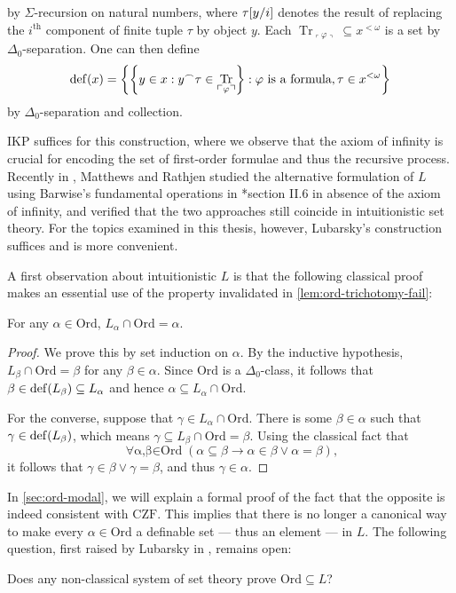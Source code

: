\documentclass[12pt,openany]{book}
\theoremstyle{plain}
\theoremstyle{definition}
\newcommand\god[1]{\left\ulcorner #1 \right\urcorner}
\newcommand\opA[1]{\mathop{\forall #1}}
\DeclareMathOperator\dd{def}
\DeclareMathOperator\Tr{Tr}
\newcommand\KP{\mathrm{KP}}
\newcommand\CZF{\mathrm{CZF}}
\newcommand\IKP{\mathrm{IKP}}
\newcommand\ZF{\mathrm{ZF}}
\newcommand\Ord{\mathrm{Ord}}
\begin{document}
by $\Sigma$-recursion on natural numbers, where $\tau\mleft[y/i\mright]$ denotes the result of replacing the $i^\text{th}$ component of finite tuple $\tau$ by object $y$. Each $\Tr_{\god{\varphi}} \subseteq x^{< \omega}$ is a set by $\Delta_0$-separation. One can then define
\[\dd\mleft(x\mright) = \left\{\left\{y \in x : y^\frown \tau \in \Tr_{\god{\varphi}}\right\} : \text{$\varphi$ is a formula}, \tau \in x^{< \omega}\right\}\]
by $\Delta_0$-separation and collection.

$\IKP$ suffices for this construction, where we observe that the axiom of infinity is crucial for encoding the set of first-order formulae and thus the recursive process. Recently in \cite{matthews-rathjen24-constructible-universe}, Matthews and Rathjen studied the alternative formulation of $L$ using Barwise's fundamental operations in \cite{barwise75-admissible-sets}*{section II.6} in absence of the axiom of infinity, and verified that the two approaches still coincide in intuitionistic set theory. For the topics examined in this thesis, however, Lubarsky's construction suffices and is more convenient.

A first observation about intuitionistic $L$ is that the following classical proof makes an essential use of the property invalidated in \autoref{lem:ord-trichotomy-fail}:
\begin{lemma}[$\ZF$ or $\KP$]
  \label{lem:classical-ord-in-l}
  For any $\alpha \in \Ord$, $L_\alpha \cap \Ord = \alpha$.
\end{lemma}

\begin{proof}
  We prove this by set induction on $\alpha$. By the inductive hypothesis, $L_\beta \cap \Ord = \beta$ for any $\beta \in \alpha$. Since $\Ord$ is a $\Delta_0$-class, it follows that $\beta \in \dd\mleft(L_\beta\mright) \subseteq L_\alpha$ and hence $\alpha \subseteq L_\alpha \cap \Ord$.

  For the converse, suppose that $\gamma \in L_\alpha \cap \Ord$. There is some $\beta \in \alpha$ such that $\gamma \in \dd\mleft(L_\beta\mright)$, which means $\gamma \subseteq L_\beta \cap \Ord = \beta$. Using the classical fact that
  \[\opA{\alpha, \beta \in \Ord} \left(\alpha \subseteq \beta \rightarrow \alpha \in \beta \lor \alpha = \beta\right),\]
  it follows that $\gamma \in \beta \lor \gamma = \beta$, and thus $\gamma \in \alpha$.
\end{proof}

In \autoref{sec:ord-modal}, we will explain a formal proof of the fact that the opposite is indeed consistent with $\CZF$. This implies that there is no longer a canonical way to make every $\alpha \in \Ord$ a definable set --- thus an element --- in $L$. The following question, first raised by Lubarsky in \cite{lubarsky93-intuitionistic-l}, remains open:
\begin{problem}
\label{prob:ord-in-l}
Does any non-classical system of set theory prove $\Ord \subseteq L$?
\end{problem}
\end{document}
